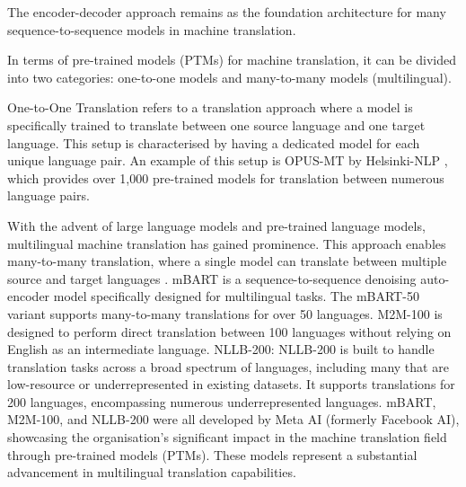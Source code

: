 \documentclass[a4paper]{article}
\begin{document}
The encoder-decoder approach \cite{cho-2014-properties} remains as the foundation architecture for many sequence-to-sequence models in machine translation.

In terms of pre-trained models (PTMs) for machine translation, it can be divided into two categories: one-to-one models and many-to-many models (multilingual).

One-to-One Translation refers to a translation approach where a model is specifically trained to translate between one source language and one target language. This setup is characterised by having a dedicated model for each unique language pair. An example of this setup is OPUS-MT by Helsinki-NLP \cite{tiedemann-2020-opus-mt}, which provides over 1,000 pre-trained models for translation between numerous language pairs.

With the advent of large language models and pre-trained language models, multilingual machine translation has gained prominence. This approach enables many-to-many translation, where a single model can translate between multiple source and target languages \cite{aharoni-2019-massively-multilingual}. mBART \cite{liu-2020-mbart} is a sequence-to-sequence denoising auto-encoder model specifically designed for multilingual tasks. The mBART-50 variant supports many-to-many translations for over 50 languages. M2M-100 \cite{fan-2020-m2m100} is designed to perform direct translation between 100 languages without relying on English as an intermediate language. NLLB-200: NLLB-200 \cite{nllb200-2020} is built to handle translation tasks across a broad spectrum of languages, including many that are low-resource or underrepresented in existing datasets. It supports translations for 200 languages, encompassing numerous underrepresented languages. mBART, M2M-100, and NLLB-200 were all developed by Meta AI (formerly Facebook AI), showcasing the organisation's significant impact in the machine translation field through pre-trained models (PTMs). These models represent a substantial advancement in multilingual translation capabilities.

\end{document}
